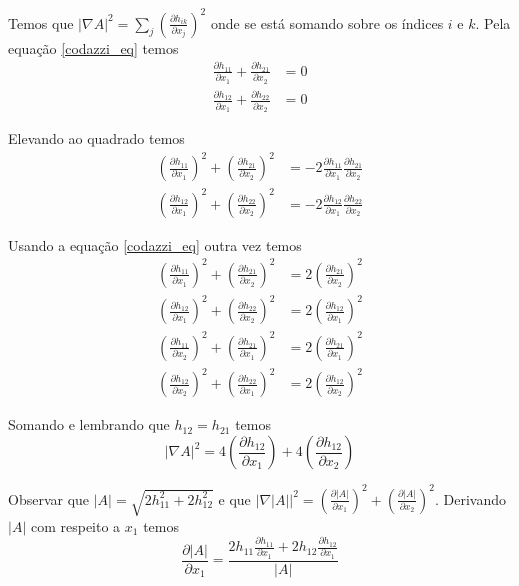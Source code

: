 \begin{demonstracao}
	Temos que $ | \nabla A |^2 = \sum_j \left( \frac{\partial h_{ik}}{\partial x_j} \right)^2 $ onde se está somando sobre os índices $i$ e $k$. Pela equação \ref{codazzi_eq} temos
	\begin{align*}
		\frac{\partial h_{11}}{\partial x_1} + \frac{\partial h_{21}}{\partial x_2} &= 0\\
		\frac{\partial h_{12}}{\partial x_1} + \frac{\partial h_{22}}{\partial x_2} &= 0
	\end{align*}
	
	Elevando ao quadrado temos
	\begin{align*}
		\left( \frac{\partial h_{11}}{\partial x_1} \right)^2 + \left( \frac{\partial h_{21}}{\partial x_2} \right)^2  &= - 2 \frac{\partial h_{11}}{\partial x_1} \frac{\partial h_{21}}{\partial x_2}  \\
		\left( \frac{\partial h_{12}}{\partial x_1} \right)^2 + \left( \frac{\partial h_{22}}{\partial x_2} \right)^2 &= - 2 \frac{\partial h_{12}}{\partial x_1} \frac{\partial h_{22}}{\partial x_2}
	\end{align*}
	
	Usando a equação \ref{codazzi_eq} outra vez temos
	\begin{align*}
		\left( \frac{\partial h_{11}}{\partial x_1} \right)^2 + \left( \frac{\partial h_{21}}{\partial x_2} \right)^2  &=  2  \left( \frac{\partial h_{21}}{\partial x_2} \right)^2  \\
		\left( \frac{\partial h_{12}}{\partial x_1} \right)^2 + \left( \frac{\partial h_{22}}{\partial x_2} \right)^2 &=  2 \left( \frac{\partial h_{12}}{\partial x_1} \right)^2\\
		\left( \frac{\partial h_{11}}{\partial x_2} \right)^2 + \left( \frac{\partial h_{21}}{\partial x_1} \right)^2  &= 2 \left( \frac{\partial h_{21}}{\partial x_1} \right)^2\\
		\left( \frac{\partial h_{12}}{\partial x_2} \right)^2 + \left( \frac{\partial h_{22}}{\partial x_1} \right)^2 &=  2 \left( \frac{\partial h_{12}}{\partial x_2} \right)^2  
	\end{align*}
	
	Somando e lembrando que $h_{12} = h_{21}$ temos
	\begin{equation*}
		| \nabla A |^2 = 4 \left( \frac{\partial h_{12}}{\partial x_1} \right) + 4 \left( \frac{\partial h_{12}}{\partial x_2} \right)
	\end{equation*}
	
	Observar que $ |A| = \sqrt{2 h_{11}^2 + 2 h_{12}^2} $ e que $ | \nabla |A| |^2 = \left( \frac{\partial |A|}{\partial x_1} \right)^2 + \left( \frac{\partial |A|}{\partial x_2} \right)^2 $. Derivando $ |A| $ com respeito a $x_1$ temos
	\begin{equation*}
		\frac{\partial |A|}{\partial x_1} = \frac{2 h_{11} \frac{\partial h_{11}}{\partial x_1} + 2 h_{12} \frac{\partial h_{12}}{\partial x_1}}{|A|}
	\end{equation*}
	

\end{demonstracao}
